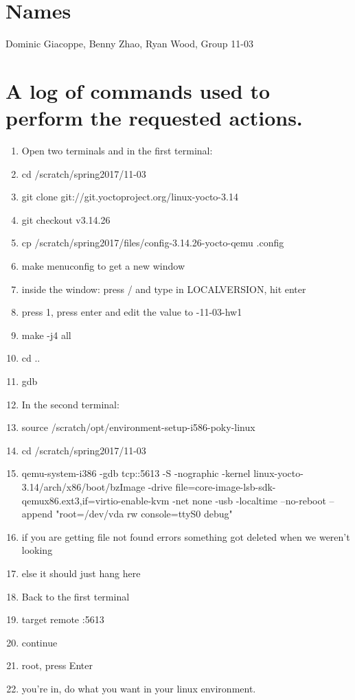 \documentclass[IEEEtran,letterpaper,10pt,notitlepage,draftclsnofoot,onecolumn]{article}
\begin{document}
\section{Names} 
Dominic Giacoppe, Benny Zhao, Ryan Wood, Group 11-03
\section{A log of commands used to perform the requested actions.}
\begin{enumerate}
\item Open two terminals and in the first terminal:
\item cd /scratch/spring2017/11-03
\item git clone git://git.yoctoproject.org/linux-yocto-3.14
\item git checkout v3.14.26
\item cp /scratch/spring2017/files/config-3.14.26-yocto-qemu .config
\item make menuconfig to get a new window
\item inside the window: press / and type in LOCALVERSION, hit enter
\item press 1, press enter and edit the value to -11-03-hw1
\item make -j4 all
\item cd .. 
\item gdb
\item In the second terminal:
\item source /scratch/opt/environment-setup-i586-poky-linux
\item cd /scratch/spring2017/11-03
\sloppy
\item qemu-system-i386 -gdb tcp::5613 -S -nographic -kernel linux-yocto-3.14/arch/x86/boot/bzImage  -drive file=core-image-lsb-sdk-qemux86.ext3,if=virtio-enable-kvm -net none -usb -localtime --no-reboot --append "root=/dev/vda rw console=ttyS0 debug"
\item if you are getting file not found errors something got deleted when we weren't looking
\item else it should just hang here
\item Back to the first terminal
\item target remote :5613
\item continue
\item root, press Enter
\item you're in, do what you want in your linux environment.
\end{enumerate} 
\end{document}
